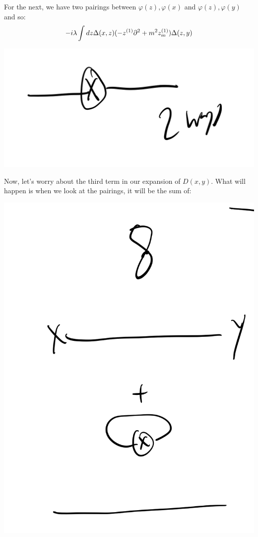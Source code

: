 For the next, we have two pairings between $\varphi(z), \varphi(x)$ and $\varphi(z), \varphi(y)$ and so:
\begin{equation}
   -i\lambda \int dz \Delta(x, z)(-z^{(1)}\partial^2 + m^2 z^{(1)}_m)\Delta(z, y)
\end{equation}

\begin{center}
   \includegraphics[scale=0.5]{Images/fig-firstordercounterterm2.png}
\end{center}


Now, let's worry about the third term in our expansion of $D(x, y)$. What will happen is when we look at the pairings, it will be the sum of:

\begin{center}
   \includegraphics[scale=0.5]{Images/fig-firstordercancellations.png}
\end{center}



